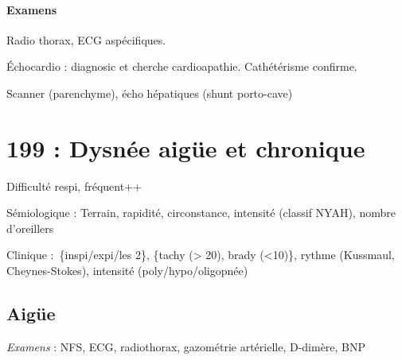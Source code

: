 \documentclass{article}
\begin{document}
\paragraph{Examens}
Radio thorax, ECG aspécifiques.

Échocardio : diagnosic et cherche cardioapathie. Cathétérisme confirme.

Scanner (parenchyme), écho hépatiques (shunt porto-cave)

\section{199 : Dysnée aigüe et chronique}%
\label{sec:199_dysnee_aigue_et_chronique}
Difficulté respi, fréquent++

Sémiologique : Terrain, rapidité, circonstance, intensité (classif NYAH), nombre d'oreillers

Clinique : \{inspi/expi/les 2\}, \{tachy (> 20), brady (<10)\}, rythme
(Kussmaul, Cheynes-Stokes), intensité (poly/hypo/oligopnée)

\subsection{Aigüe}
\textit{Examens}  : NFS, ECG, radiothorax, gazométrie artérielle, D-dimère, BNP
\end{document}
